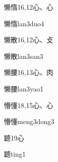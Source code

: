 \begin{entry}{懒惰}{16,12}{⼼、⼼}
  \begin{phonetics}{懒惰}{lan3duo4}
  \end{phonetics}
\end{entry}

\begin{entry}{懒散}{16,12}{⼼、⽁}
  \begin{phonetics}{懒散}{lan3san3}
  \end{phonetics}
\end{entry}

\begin{entry}{懒腰}{16,13}{⼼、⾁}
  \begin{phonetics}{懒腰}{lan3yao1}
  \end{phonetics}
\end{entry}

\begin{entry}{懵懂}{18,15}{⼼、⼼}
  \begin{phonetics}{懵懂}{meng3dong3}
  \end{phonetics}
\end{entry}

\begin{entry}{聼}{19}{⼼}
  \begin{phonetics}{聼}{ting1}
  \end{phonetics}
\end{entry}


